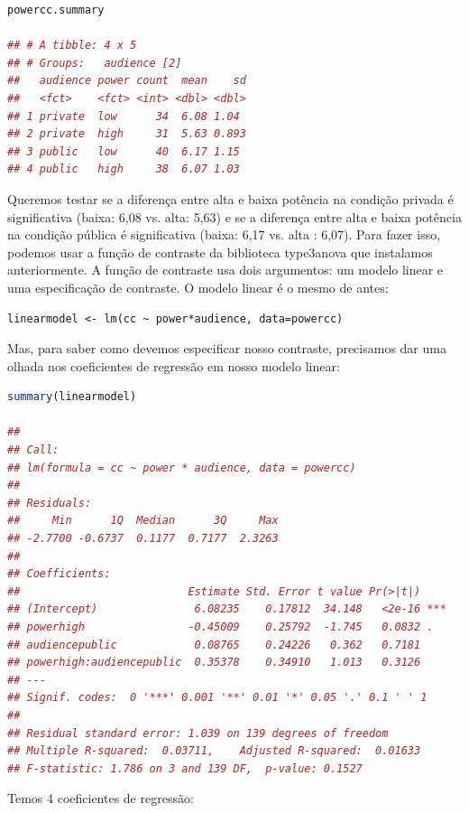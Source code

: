 \documentclass{article}
\begin{document}
\begin{lstlisting}[language=R]
powercc.summary

## # A tibble: 4 x 5
## # Groups:   audience [2]
##   audience power count  mean    sd
##   <fct>    <fct> <int> <dbl> <dbl>
## 1 private  low      34  6.08 1.04 
## 2 private  high     31  5.63 0.893
## 3 public   low      40  6.17 1.15 
## 4 public   high     38  6.07 1.03
\end{lstlisting}

Queremos testar se a diferença entre alta e baixa potência na condição privada é significativa (baixa: 6,08 vs. alta: 5,63) e se a diferença entre alta e baixa potência na condição pública é significativa (baixa: 6,17 vs. alta : 6,07). Para fazer isso, podemos usar a função de contraste da biblioteca type3anova que instalamos anteriormente. A função de contraste usa dois argumentos: um modelo linear e uma especificação de contraste. O modelo linear é o mesmo de antes:

\begin{lstlisting}[language]
linearmodel <- lm(cc ~ power*audience, data=powercc)
\end{lstlisting}

Mas, para saber como devemos especificar nosso contraste, precisamos dar uma olhada nos coeficientes de regressão em nosso modelo linear:

\begin{lstlisting}[language=R]
summary(linearmodel)

## 
## Call:
## lm(formula = cc ~ power * audience, data = powercc)
## 
## Residuals:
##     Min      1Q  Median      3Q     Max 
## -2.7700 -0.6737  0.1177  0.7177  2.3263 
## 
## Coefficients:
##                          Estimate Std. Error t value Pr(>|t|)    
## (Intercept)               6.08235    0.17812  34.148   <2e-16 ***
## powerhigh                -0.45009    0.25792  -1.745   0.0832 .  
## audiencepublic            0.08765    0.24226   0.362   0.7181    
## powerhigh:audiencepublic  0.35378    0.34910   1.013   0.3126    
## ---
## Signif. codes:  0 '***' 0.001 '**' 0.01 '*' 0.05 '.' 0.1 ' ' 1
## 
## Residual standard error: 1.039 on 139 degrees of freedom
## Multiple R-squared:  0.03711,    Adjusted R-squared:  0.01633 
## F-statistic: 1.786 on 3 and 139 DF,  p-value: 0.1527

\end{lstlisting}

\newpage

Temos 4 coeficientes de regressão:
\end{document}
